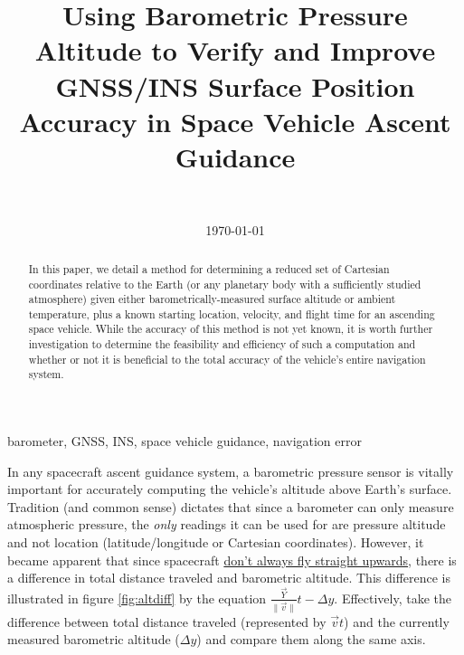 \documentclass{IEEEtran}
\begin{document}
\title{Using Barometric Pressure Altitude to Verify and Improve GNSS/INS Surface Position Accuracy in Space Vehicle Ascent Guidance}

\author{%
	\\%
}

\date{\today}

\maketitle

\begin{abstract}
In this paper, we detail a method for determining a reduced set of Cartesian
coordinates relative to the Earth (or any planetary body with a sufficiently
studied atmosphere) given either barometrically-measured surface altitude or
ambient temperature, plus a known starting location, velocity, and flight time
for an ascending space vehicle.  While the accuracy of this method is not yet
known, it is worth further investigation to determine the feasibility and
efficiency of such a computation and whether or not it is beneficial to the
total accuracy of the vehicle's entire navigation system.
\end{abstract}

\begin{IEEEkeywords}
    barometer, GNSS, INS, space vehicle guidance, navigation error
\end{IEEEkeywords}

In any spacecraft ascent guidance system, a barometric pressure sensor
is vitally important for accurately computing the vehicle's altitude above
Earth's surface.  Tradition (and common sense) dictates that since a barometer
can only measure atmospheric pressure, the \emph{only} readings it can be used
for are pressure altitude and not location (latitude/longitude or Cartesian
coordinates).  However, it became apparent that since spacecraft
\href{https://xkcd.com/2087/}{don't always fly straight upwards}, there is a
difference in total distance traveled and barometric altitude.  This difference
is illustrated in figure \ref{fig:altdiff} by the equation
$\frac{\vec{Y}}{\lVert\vec{v}\rVert}t - \Delta y$.  Effectively, take the difference
between total distance traveled (represented by $\vec{v}t$) and the currently
measured barometric altitude ($\Delta y$) and compare them along the same
axis.
\end{document}
